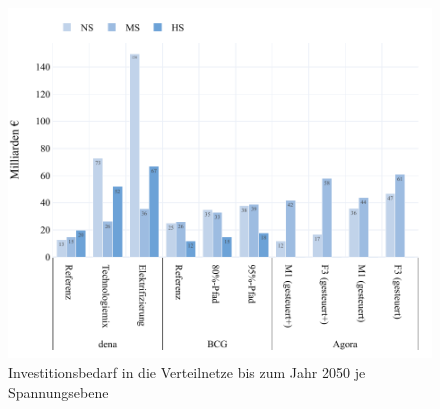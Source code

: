 \begin{figure}[H]
    \centering
    \includegraphics[width=\textwidth]{Bilder/DS-CAPEX-MA}
    \caption{Investitionsbedarf in die Verteilnetze bis zum Jahr \num{2050} je Spannungsebene}\label{fig:DSCAPEXMeta}
\end{figure}